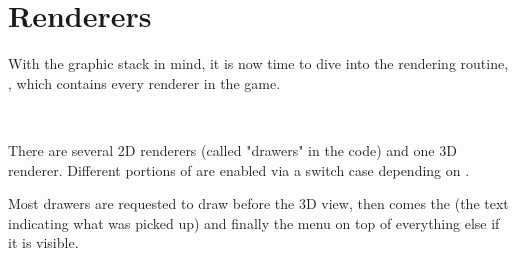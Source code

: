 \section{Renderers}
With the graphic stack in mind, it is now time to dive into the rendering routine, , which contains every renderer in the game.\\
\par
{}\\
\par
 There are several 2D renderers (called "drawers" in the code) and one 3D renderer. Different portions of  are enabled via a switch case depending on .\\
 \par
  Most drawers are requested to draw before the 3D view, then comes the  (the text indicating what was picked up) and finally the menu on top of everything else if it is visible.

